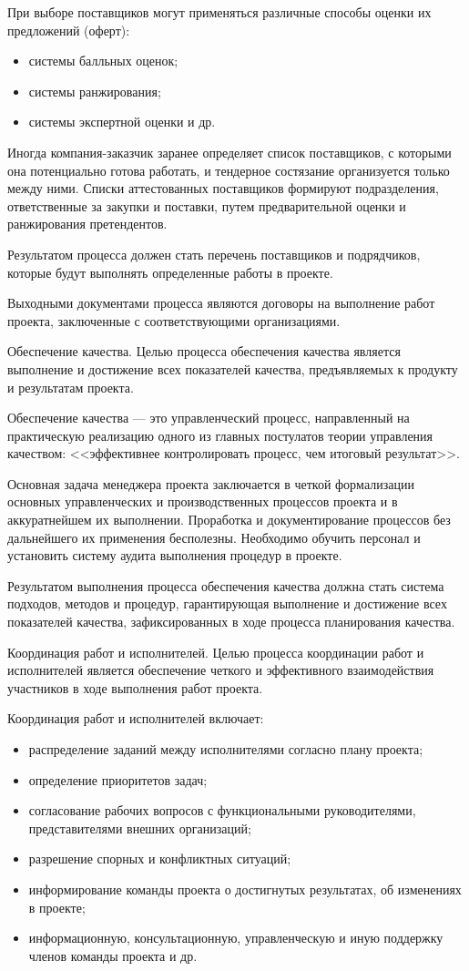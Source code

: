 При выборе поставщиков могут применяться различные способы оценки их предложений (оферт):
\begin{itemize}
	\item системы балльных оценок;
	\item системы ранжирования;
	\item системы экспертной оценки и др.
\end{itemize}

Иногда компания-заказчик заранее определяет список поставщиков, с которыми она потенциально готова работать, и тендерное состязание организуется только между ними.
Списки аттестованных поставщи­ков формируют подразделения, ответственные за закупки и поставки, путем предварительной оценки и ранжирования претендентов.

Результатом процесса должен стать перечень поставщиков и подряд­чиков, которые будут выполнять определенные работы в проекте.

Выходными документами процесса являются договоры на выпол­нение работ проекта, заключенные с соответствующими организа­циями.

Обеспечение качества.
Целью процесса обеспечения качества является выполнение и дости­жение всех показателей качества, предъявляемых к продукту и ре­зультатам проекта.

Обеспечение качества --- это управленческий процесс, направлен­ный на практическую реализацию одного из главных постулатов тео­рии управления качеством: <<эффективнее контролировать процесс, чем итоговый результат>>.

Основная задача менеджера проекта заключается в четкой фор­мализации основных управленческих и производственных процессов проекта и в аккуратнейшем их выполнении.
Проработка и документи­рование процессов без дальнейшего их применения бесполезны.
Необходимо обучить персонал и установить систему аудита выполнения процедур в проекте.

Результатом выполнения процесса обеспечения качества должна стать система подходов, методов и процедур, гарантирующая выполнение и достижение всех показателей качества, зафиксированных в ходе про­цесса планирования качества.

Координация работ и исполнителей.
Целью процесса координации работ и исполнителей является обес­печение четкого и эффективного взаимодействия участников в ходе выполнения работ проекта.

Координация работ и исполнителей включает:
\begin{itemize}
	\item распределение заданий между исполнителями согласно плану про­екта;
	\item определение приоритетов задач;
	\item согласование рабочих вопросов с функциональными руководите­лями, представителями внешних организаций;
	\item разрешение спорных и конфликтных ситуаций;
	\item информирование команды проекта о достигнутых результатах, об изменениях в проекте;
	\item информационную, консультационную, управленческую и иную поддержку членов команды проекта и др.
\end{itemize}

